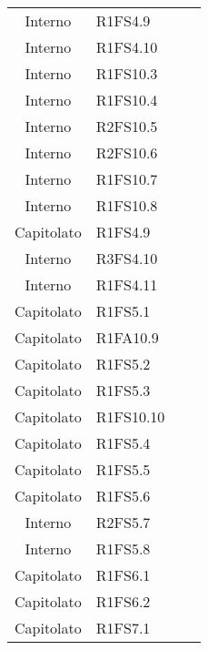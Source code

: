 {\begin{longtable}{ c C{4cm} c c}
Interno & R1FS4.9\\

Interno & R1FS4.10\\


Interno & R1FS10.3\\

Interno & R1FS10.4\\

Interno & R2FS10.5\\

Interno & R2FS10.6\\

Interno & R1FS10.7\\

Interno & R1FS10.8\\

Capitolato & R1FS4.9\\


Interno & R3FS4.10\\

Interno & R1FS4.11\\

Capitolato & R1FS5.1\\

Capitolato & R1FA10.9\\

Capitolato & R1FS5.2\\

Capitolato & R1FS5.3\\

Capitolato & R1FS10.10\\

Capitolato & R1FS5.4\\

Capitolato & R1FS5.5\\


Capitolato & R1FS5.6\\

Interno & R2FS5.7\\

Interno & R1FS5.8\\

Capitolato & R1FS6.1\\

Capitolato & R1FS6.2\\

Capitolato & R1FS7.1\\


\end{longtable}}
